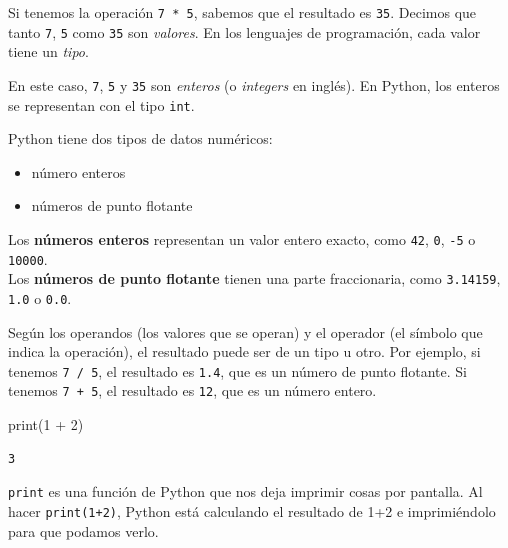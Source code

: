 \documentclass[
  letterpaper,
  DIV=11,
  numbers=noendperiod]{scrreprt}
\newenvironment{Shaded}{\begin{snugshade}}{\end{snugshade}}
\newcommand{\BuiltInTok}[1]{\textcolor[rgb]{0.00,0.23,0.31}{#1}}
\newcommand{\DecValTok}[1]{\textcolor[rgb]{0.68,0.00,0.00}{#1}}
\newcommand{\NormalTok}[1]{\textcolor[rgb]{0.00,0.23,0.31}{#1}}
\newcommand{\OperatorTok}[1]{\textcolor[rgb]{0.37,0.37,0.37}{#1}}
\providecommand{\tightlist}{%
  \setlength{\itemsep}{0pt}\setlength{\parskip}{0pt}}\usepackage{longtable,booktabs,array}
\begin{document}
Si tenemos la operación \texttt{7\ *\ 5}, sabemos que el resultado es
\texttt{35}. Decimos que tanto \texttt{7}, \texttt{5} como \texttt{35}
son \emph{valores}. En los lenguajes de programación, cada valor tiene
un \emph{tipo}.

En este caso, \texttt{7}, \texttt{5} y \texttt{35} son \emph{enteros} (o
\emph{integers} en inglés). En Python, los enteros se representan con el
tipo \texttt{int}.

Python tiene dos tipos de datos numéricos:

\begin{itemize}
\tightlist
\item
  número enteros
\item
  números de punto flotante
\end{itemize}

Los \textbf{números enteros} representan un valor entero exacto, como
\texttt{42}, \texttt{0}, \texttt{-5} o \texttt{10000}.\\
Los \textbf{números de punto flotante} tienen una parte fraccionaria,
como \texttt{3.14159}, \texttt{1.0} o \texttt{0.0}.

Según los operandos (los valores que se operan) y el operador (el
símbolo que indica la operación), el resultado puede ser de un tipo u
otro. Por ejemplo, si tenemos \texttt{7\ /\ 5}, el resultado es
\texttt{1.4}, que es un número de punto flotante. Si tenemos
\texttt{7\ +\ 5}, el resultado es \texttt{12}, que es un número entero.

\begin{Shaded}
\begin{Highlighting}[]
\BuiltInTok{print}\NormalTok{(}\DecValTok{1} \OperatorTok{+} \DecValTok{2}\NormalTok{)}
\end{Highlighting}
\end{Shaded}

\begin{verbatim}
3
\end{verbatim}

\begin{tcolorbox}[enhanced jigsaw, arc=.35mm, toptitle=1mm, colframe=quarto-callout-note-color-frame, bottomtitle=1mm, opacitybacktitle=0.6, colbacktitle=quarto-callout-note-color!10!white, leftrule=.75mm, coltitle=black, toprule=.15mm, titlerule=0mm, title=\textcolor{quarto-callout-note-color}{\faInfo}\hspace{0.5em}{Note}, bottomrule=.15mm, rightrule=.15mm, colback=white, breakable, opacityback=0, left=2mm]

\texttt{print} es una función de Python que nos deja imprimir cosas por
pantalla. Al hacer \texttt{print(1+2)}, Python está calculando el
resultado de 1+2 e imprimiéndolo para que podamos verlo.

\end{tcolorbox}
\end{document}
